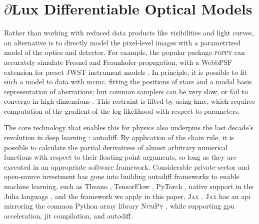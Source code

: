 \documentclass[]{spieman}
\newcommand\jax{\textsc{Jax}\xspace}
\newcommand\dlux{$\partial$Lux\xspace}
\begin{document}
\section{\dlux Differentiable Optical Models}
\label{sec:dlux}

Rather than working with reduced data products like visibilities and light curves, an alternative is to directly model the pixel-level images with a parametrized model of the optics and detector. 
For example, the popular package \textsc{poppy} \cite{poppy} can accurately simulate Fresnel and Fraunhofer propagation, with a WebbPSF extension for preset JWST instrument models \cite{Perrin2014}. 
In principle, it is possible to fit such a model to data with \ac{mcmc}, fitting the positions of stars and a modal basis representation of aberrations; but common samplers can be very slow, or fail to converge in high dimensions \cite{Huijser2022}. This restraint is lifted by using \ac{hmc}, which requires computation of the gradient of the log-likelihood with respect to parameters. 

The core technology that enables this for physics also underpins the last decade's revolution in deep learning \cite{lecun15}: autodiff. By application of the chain rule, it is possible to calculate the partial derivatives of almost arbitrary numerical functions with respect to their floating-point arguments, so long as they are executed in an appropriate software framework. 
Considerable private-sector and open-source investment has gone into building autodiff frameworks to enable machine learning, such as Theano \cite{theano}, TensorFlow \cite{tensorflow2015}, PyTorch \cite{pytorch}, native support in the Julia language \cite{julia}, and the framework we apply in this paper, \textsc{Jax} \cite{jax}. \jax has an \ac{api} mirroring the common Python array library \textsc{NumPy} \cite{numpy}, while supporting \ac{gpu} acceleration, \ac{jit} compilation, and autodiff.
\end{document}
